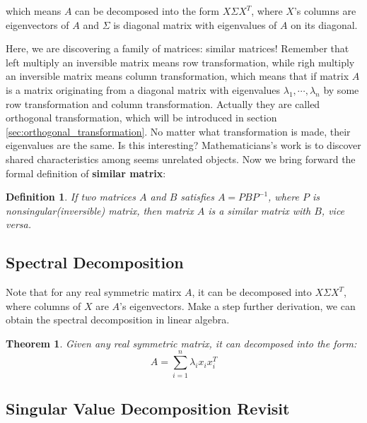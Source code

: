 \documentclass[a4paper]{book}
\newtheorem{theorem}{Theorem}[section]
\newtheorem{definition}{Definition}[section]
\begin{document}
      which means $A$ can be decomposed into the form $X\Sigma X^{T}$,
      where $X$'s columns are eigenvectors of $A$ and $\Sigma$ is
      diagonal matrix with eigenvalues of $A$ on its diagonal.

      Here, we are discovering a family of matrices: similar matrices!
      Remember that left multiply an inversible matrix means row
      transformation, while righ multiply an inversible matrix means
      column transformation, which means that if matrix $A$ is a matrix
      originating from a diagonal matrix with eigenvalues $\lambda_{1},
      \cdots, \lambda_{n}$ by some row transformation and column
      transformation. Actually they are called orthogonal
      transformation, which will be introduced in section
      \ref{sec:orthogonal_transformation}. No matter what transformation
      is made, their eigenvalues are the same. Is this interesting?
      Mathematicians's work is to discover shared characteristics among
      seems unrelated objects. Now we bring forward the formal
      definition of \textbf{similar matrix}:

      \begin{definition}
        If two matrices $A$ and $B$ satisfies $A = PBP^{-1}$, where $P$
        is nonsingular(inversible) matrix, then matrix $A$ is a similar
        matrix with $B$, vice versa.
      \end{definition}

      \subsection{Spectral Decomposition}
      \label{sec:spectral_decomposition}
      Note that for any real symmetric matirx $A$, it can be decomposed into
      $X\Sigma X^{T}$, where columns of $X$ are $A$'s eigenvectors. Make a step
      further derivation, we can obtain the spectral decomposition in linear
      algebra.

      \begin{theorem}
        Given any real symmetric matrix, it can decomposed into the form:
          \begin{displaymath}
            A = \sum\limits^{n}_{i=1}\lambda_{i}x_{i}x_{i}^{T}
          \end{displaymath}
      \end{theorem}


      \subsection{Singular Value Decomposition Revisit}
\end{document}
